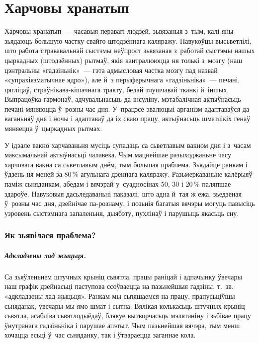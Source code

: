 \chapter{Харчовы хранатып}

Харчовы хранатып~--- часавыя перавагі людзей, зьвязаныя з~тым, калі яны зьядаюць большую частку свайго штодзённага каляражу. Навукоўцы высьветлілі, што работа стрававальнай сыстэмы наўпрост зьвязаная з~работай сыстэмы нашых цыркадных (штодзённых) рытмаў, якія кантралююцца ня толькі з~мозгу (наш цэнтральны «гадзіньнік»~--- гэта адмысловая частка мозгу пад назвай «супрахіязматычнае ядро»), але й~з перыферычнага «гадзіньніка»~--- печані, цягліцаў, страўнікава-кішачнага тракту, белай тлушчавай тканкі й~іншых. Выпрацоўка гармонаў, адчувальнасьць да інсуліну, мэтабалічная актыўнасьць печані мяняюцца ў~розны час дня. У~працэсе эвалюцыі арганізм адаптаваўся да ваганьняў дня і ночы і адаптаваў да іх сваю працу, актыўнасьць шматлікіх генаў мяняецца ў~цыркадных рытмах.

У ідэале вакно харчаваньня мусіць супадаць са сьветлавым вакном дня і з~часам максымальнай актыўнасьці чалавека. Чым мацнейшае разыходжаньне часу харчовага вакна са сьветлавым днём, тым большая праблема. Зьядайце ранкам і ўдзень ня меней за 80\,\% агульнага дзённага каляражу. Разьмеркаваньне калёрыяў паміж сьняданкам, абедам і вячэрай у~суадносінах 50, 30 і 20\,\% паляпшае здароўе. Навуковыя дасьледаваньні паказалі, што адна й~тая ж ежа, зьедзеная ў~розны час дня, дзейнічае па-рознаму, і позьнія багатыя вячэры могуць павысіць узровень сыстэмнага запаленьня, дыябэту, пухлінаў і парушыць якасьць сну.

\subsection{Як зьявілася праблема?}

\paragraph{Адкладзены лад жыцьця.}
Са зьяўленьнем штучных крыніц сьвятла, працы раніцай і адпачынку ўвечары наш графік дзейнасьці паступова ссоўваецца на пазьнейшыя гадзіны, т.~зв. «адкладзены лад жыцьця». Ранкам мы сьпяшаемся на працу, прапусьціўшы сьняданак, увечары мы ямо шмат і сытна. Вялікая колькасьць штучных крыніц сьвятла, асабліва сьвятлодыёдаў, блякуе вытворчасьць мэлятаніну і зьбівае працу ўнутранага гадзіньніка і парушае апэтыт. Чым пазьнейшая вячэра, тым менш хочацца есьці ў~час сьняданку, так і ўтвараецца заганнае кола.

